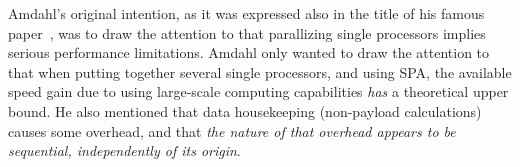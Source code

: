 





{
Amdahl's original intention, as it was expressed also in the title 
of his famous paper~\cite{AmdahlSingleProcessor67}, was to draw the attention to that parallizing single processors
implies serious performance limitations.
Amdahl only wanted to draw the attention to that when putting together
several single processors, and using \gls{SPA}, the available speed gain due to using large-scale computing capabilities \textit{has} a theoretical upper bound.
He also mentioned that data housekeeping (non-payload calculations)
causes some overhead, 
and  that \emph{the nature of that overhead appears to be sequential, independently of its origin}.
 
}

